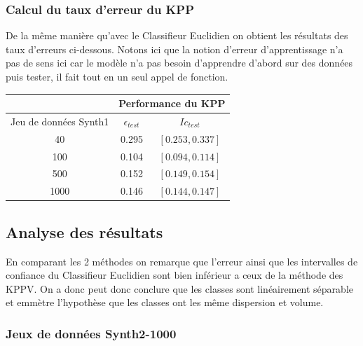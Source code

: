 \documentclass[10pt]{article}
\begin{document}
				\subsubsection{Calcul du taux d'erreur du KPP }
				De la même manière qu'avec le Classifieur Euclidien on obtient les résultats des taux d'erreurs ci-dessous. Notons ici que la notion d'erreur d'apprentissage n'a pas de sens ici car le modèle n'a pas besoin d'apprendre d'abord sur des données puis tester, il fait tout en un seul appel de fonction.
		\begin{center}		
			\begin{tabular}{ | c | c | c |}
				\rowcolor{lightgray} 
				  &  \multicolumn{2}{c}{Performance du KPP}\\
				
				\hline
				Jeu de données Synth1 &   $\epsilon_{test}$ &  $Ic_{test}$\\
				\hline
				\multirow{1}{*}{40}       &0.295  & $[0.253, 0.337]$ 			 \\
				
				\hline
				\multirow{1}{*}{100}      & 0.104 	& $[0.094, 0.114]$  \\
				
				\hline
				\multirow{1}{*}{500}      &  0.152  & 	$[0.149, 0.154]$	\\
				
				\hline
				\multirow{1}{*}{1000}      & 0.146  & 	$[0.144, 0.147]$ 		\\
				
				\hline
			\end{tabular}
		\end{center}
	

			\subsection{Analyse des résultats } 
			 En comparant les 2 méthodes on remarque que l'erreur ainsi que les intervalles de confiance du Classifieur Euclidien sont bien inférieur a ceux de la méthode des KPPV. On a donc peut donc conclure que les classes sont linéairement séparable et emmètre l'hypothèse que les classes ont les même dispersion et volume.
			
				\subsubsection{ Jeux de données Synth2-1000}
				
\end{document}
